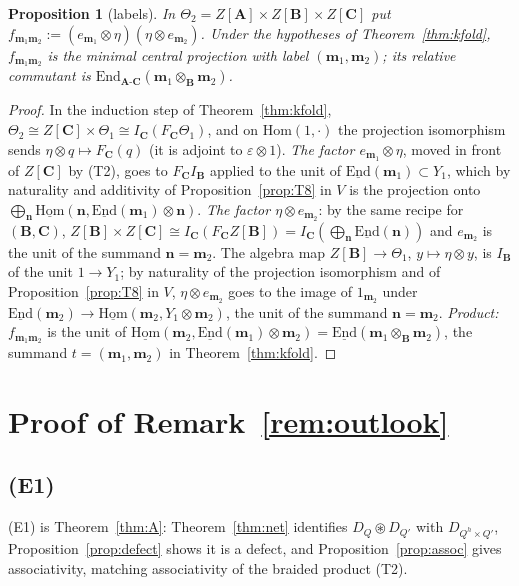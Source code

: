 \documentclass[11pt]{article}
\newtheorem{proposition}[theorem]{Proposition}
\theoremstyle{definition}
\theoremstyle{remark}
\newcommand{\bfB}{\mathbf B}
\newcommand{\bfA}{\mathbf A}
\newcommand{\bfC}{\mathbf C}
\newcommand{\cfus}{\circledast}
\begin{document}
\begin{proposition}[labels]\label{prop:labels}
In $\Theta_2=Z[\bfA]\times Z[\bfB]\times Z[\bfC]$ put $f_{\mathbf m_1\mathbf m_2}:=(e_{\mathbf m_1}\otimes\eta)(\eta\otimes e_{\mathbf m_2})$. Under the hypotheses of Theorem~\ref{thm:kfold}, $f_{\mathbf m_1\mathbf m_2}$ is the minimal central projection with label $(\mathbf m_1,\mathbf m_2)$; its relative commutant is $\mathrm{End}_{\bfA\text{-}\bfC}(\mathbf m_1\otimes_{\bfB}\mathbf m_2)$.
\end{proposition}
\begin{proof}
In the induction step of Theorem~\ref{thm:kfold}, $\Theta_2\cong Z[\bfC]\times\Theta_1\cong I_{\bfC}(F_{\bfC}\Theta_1)$, and on $\mathrm{Hom}(1,\cdot)$ the projection isomorphism sends $\eta\otimes q\mapsto F_{\bfC}(q)$ (it is adjoint to $\varepsilon\otimes1$). \emph{The factor $e_{\mathbf m_1}\otimes\eta$}, moved in front of $Z[\bfC]$ by (T2), goes to $F_{\bfC}I_{\bfB}$ applied to the unit of $\underline{\mathrm{End}}(\mathbf m_1)\subset Y_1$, which by naturality and additivity of Proposition~\ref{prop:T8} in $V$ is the projection onto $\bigoplus_{\mathbf n}\underline{\mathrm{Hom}}(\mathbf n,\underline{\mathrm{End}}(\mathbf m_1)\otimes\mathbf n)$. \emph{The factor $\eta\otimes e_{\mathbf m_2}$}: by the same recipe for $(\bfB,\bfC)$, $Z[\bfB]\times Z[\bfC]\cong I_{\bfC}(F_{\bfC}Z[\bfB])=I_{\bfC}(\bigoplus_{\mathbf n}\underline{\mathrm{End}}(\mathbf n))$ and $e_{\mathbf m_2}$ is the unit of the summand $\mathbf n=\mathbf m_2$. The algebra map $Z[\bfB]\to\Theta_1$, $y\mapsto\eta\otimes y$, is $I_{\bfB}$ of the unit $1\to Y_1$; by naturality of the projection isomorphism and of Proposition~\ref{prop:T8} in $V$, $\eta\otimes e_{\mathbf m_2}$ goes to the image of $1_{\mathbf m_2}$ under $\underline{\mathrm{End}}(\mathbf m_2)\to\underline{\mathrm{Hom}}(\mathbf m_2,Y_1\otimes\mathbf m_2)$, the unit of the summand $\mathbf n=\mathbf m_2$. \emph{Product:} $f_{\mathbf m_1\mathbf m_2}$ is the unit of $\underline{\mathrm{Hom}}(\mathbf m_2,\underline{\mathrm{End}}(\mathbf m_1)\otimes\mathbf m_2)=\underline{\mathrm{End}}(\mathbf m_1\otimes_{\bfB}\mathbf m_2)$, the summand $t=(\mathbf m_1,\mathbf m_2)$ in Theorem~\ref{thm:kfold}.
\end{proof}


\section{Proof of Remark~\ref{rem:outlook}}\label{sec:capstone}
\subsection{(E1)}
(E1) is Theorem~\ref{thm:A}: Theorem~\ref{thm:net} identifies $D_Q\cfus D_{Q'}$ with $D_{Q^h\times Q'}$, Proposition~\ref{prop:defect} shows it is a defect, and Proposition~\ref{prop:assoc} gives associativity, matching associativity of the braided product (T2).
\end{document}
